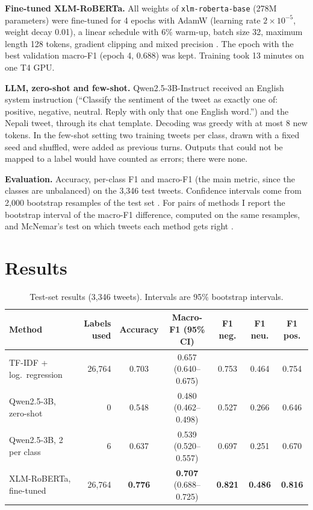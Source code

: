 \documentclass[11pt,a4paper]{article}
\begin{document}
\textbf{Fine-tuned XLM-RoBERTa.} All weights of \texttt{xlm-roberta-base} (278M parameters) were fine-tuned for 4 epochs with AdamW (learning rate $2\times10^{-5}$, weight decay 0.01), a linear schedule with 6\% warm-up, batch size 32, maximum length 128 tokens, gradient clipping and mixed precision \cite{wolf2020}. The epoch with the best validation macro-F1 (epoch 4, 0.688) was kept. Training took 13 minutes on one T4 GPU.

\textbf{LLM, zero-shot and few-shot.} Qwen2.5-3B-Instruct \cite{qwen2024} received an English system instruction (``Classify the sentiment of the tweet as exactly one of: positive, negative, neutral. Reply with only that one English word.'') and the Nepali tweet, through its chat template. Decoding was greedy with at most 8 new tokens. In the few-shot setting two training tweets per class, drawn with a fixed seed and shuffled, were added as previous turns. Outputs that could not be mapped to a label would have counted as errors; there were none.

\textbf{Evaluation.} Accuracy, per-class F1 and macro-F1 (the main metric, since the classes are unbalanced) on the 3,346 test tweets. Confidence intervals come from 2,000 bootstrap resamples of the test set \cite{efron1993}. For pairs of methods I report the bootstrap interval of the macro-F1 difference, computed on the same resamples, and McNemar's test on which tweets each method gets right \cite{mcnemar1947,dietterich1998}.

\section{Results}

\begin{table}[H]
\centering\small
\caption{Test-set results (3,346 tweets). Intervals are 95\% bootstrap intervals.}
\label{tab:main}
\setlength{\tabcolsep}{4pt}\begin{tabular}{@{}l r c c c c c@{}}
\toprule
Method & Labels used & Accuracy & Macro-F1 (95\% CI) & F1 neg. & F1 neu. & F1 pos. \\
\midrule
TF-IDF + log.\ regression & 26,764 & 0.703 & 0.657 (0.640--0.675) & 0.753 & 0.464 & 0.754 \\
Qwen2.5-3B, zero-shot & 0 & 0.548 & 0.480 (0.462--0.498) & 0.527 & 0.266 & 0.646 \\
Qwen2.5-3B, 2 per class & 6 & 0.637 & 0.539 (0.520--0.557) & 0.697 & 0.251 & 0.670 \\
XLM-RoBERTa, fine-tuned & 26,764 & \textbf{0.776} & \textbf{0.707} (0.688--0.725) & \textbf{0.821} & \textbf{0.486} & \textbf{0.816} \\
\bottomrule
\end{tabular}
\end{table}
\end{document}
